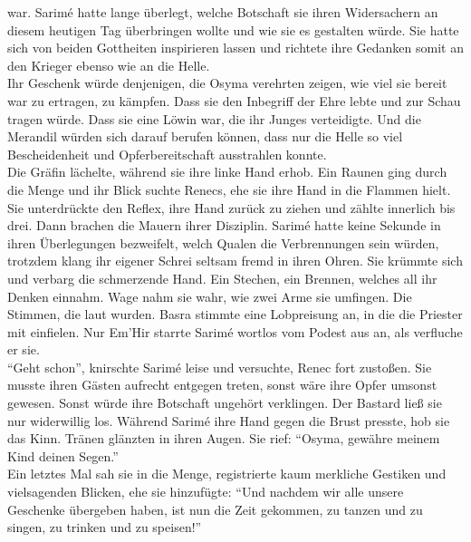 war. Sarimé hatte lange überlegt, welche Botschaft sie ihren Widersachern an diesem heutigen Tag 
überbringen wollte und wie sie es gestalten würde. Sie hatte sich von beiden Gottheiten inspirieren 
lassen und richtete ihre Gedanken somit an den Krieger ebenso wie an die Helle.\\
Ihr Geschenk würde denjenigen, die Osyma verehrten zeigen, wie viel sie bereit war zu ertragen, zu 
kämpfen. Dass sie den Inbegriff der Ehre lebte und zur Schau tragen würde. Dass sie eine Löwin war, 
die ihr Junges verteidigte. Und die Merandil würden sich darauf berufen können, dass nur die Helle 
so viel Bescheidenheit und Opferbereitschaft ausstrahlen konnte.\\
Die Gräfin lächelte, während sie ihre linke Hand erhob. Ein Raunen ging durch die Menge und ihr 
Blick suchte Renecs, ehe sie ihre Hand in die Flammen hielt. Sie unterdrückte den Reflex, ihre Hand 
zurück zu ziehen und zählte innerlich bis drei. Dann brachen die Mauern ihrer Disziplin. Sarimé 
hatte keine Sekunde in ihren Überlegungen bezweifelt, welch Qualen die Verbrennungen sein würden, 
trotzdem klang ihr eigener Schrei seltsam fremd in ihren Ohren. Sie krümmte sich und verbarg die 
schmerzende Hand. Ein Stechen, ein Brennen, welches all ihr Denken einnahm. Wage nahm sie wahr, wie 
zwei Arme sie umfingen. Die Stimmen, die laut wurden. Basra stimmte eine Lobpreisung an, in die die 
Priester mit einfielen. Nur Em'Hir starrte Sarimé wortlos vom Podest aus an, als verfluche er sie.\\
``Geht schon'', knirschte Sarimé leise und versuchte, Renec fort zustoßen. Sie musste 
ihren Gästen aufrecht entgegen treten, sonst wäre ihre Opfer umsonst gewesen. Sonst würde ihre 
Botschaft ungehört verklingen. Der Bastard ließ sie nur widerwillig los. Während Sarimé ihre Hand 
gegen die Brust presste, hob sie das Kinn. Tränen glänzten in ihren Augen. Sie rief: ``Osyma, 
gewähre meinem Kind deinen Segen.''\\
Ein letztes Mal sah sie in die Menge, registrierte kaum merkliche Gestiken und vielsagenden 
Blicken, ehe sie hinzufügte: ``Und nachdem wir alle unsere Geschenke übergeben haben, ist nun die 
Zeit gekommen, zu tanzen und zu singen, zu trinken und zu speisen!''\\

